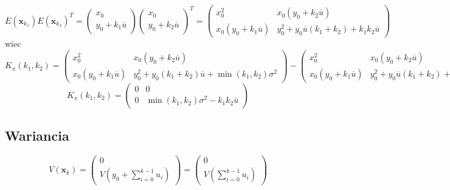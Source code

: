 \documentclass[10pt,a4paper]{article}
\begin{document}
\begin{equation}
E \left( \textbf{x}_{k_1} \right) E \left( \textbf{x}_{k_2} \right) ^T = 
\left(
\begin{matrix}
	x_0 \\ y_0 + k_1 \overline{u}
\end{matrix}
\right)
\left(
\begin{matrix}
	x_0 \\ y_0 + k_2 \overline{u}
\end{matrix}
\right)^T=
\left(
	\begin{matrix}
	x_0^2 & x_0 \left( y_0 + k_2 \overline{u} \right) \\
	x_0 \left( y_0+k_1 \overline{u} \right) &  y_0^2 + y_0 \overline{u} \left(k_1+k_2 \right) + k_1 k_2 \overline{u} 
	\end{matrix}
\right)
\end{equation}
wiec 
\begin{equation}
K_x(k_1, k_2) = 
\left( 
		\begin{matrix}
			x_{0}^2 & x_0(y_{0} + k_2 \overline{u} ) \\
			x_0(y_{0} + k_1 \overline{u}) & y_0^2 + y_0(k_1+k_2) \overline{u}+\min( k_1, k_2 ) \sigma^2
		\end{matrix}			
	\right)
-
\left(
	\begin{matrix}
	x_0^2 & x_0 \left( y_0 + k_2 \overline{u} \right) \\
	x_0 \left( y_0+k_1 \overline{u} \right) &  y_0^2 + y_0 \overline{u} \left(k_1+k_2 \right) + k_1 k_2 \overline{u} 
	\end{matrix}
\right)
\end{equation}
\begin{equation}
K_x(k_1, k_2) = 
\left(
	\begin{matrix}
	0 & 0 \\
	0 & \min \left( k_1, k_2 \right) \sigma ^2 - k_1 k_2 \overline{u} 
	\end{matrix}
\right)
\end{equation}
\subsection*{Wariancia}
\begin{equation}
V \left( \textbf{x}_k \right) = 
\left(
	\begin{matrix}
	0 \\ V \left( y_0 + \sum \limits_{i=0}^{k-1} u_i \right)
	\end{matrix}
\right) = 
\left(
	\begin{matrix}
	0 \\ V \left(\sum \limits_{i=0}^{k-1} u_i \right)
	\end{matrix}
\right)
\end{equation}
\end{document}
